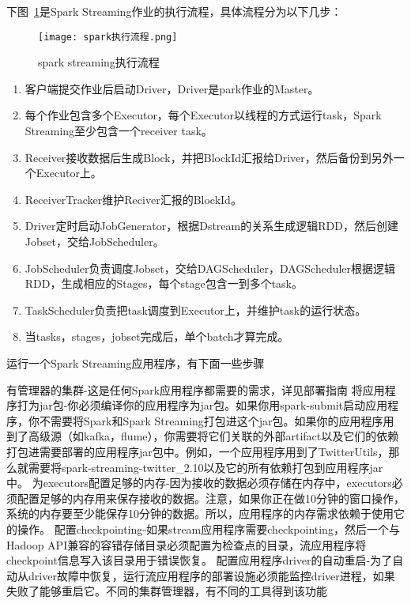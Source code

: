   下图~\ref{fig:spark streaming}是Spark Streaming作业的执行流程，具体流程分为以下几步：
  \begin{figure}
    \centering
    \texttt{[image: spark执行流程.png]}
    \caption{spark streaming执行流程}
    \label{fig:spark streaming}
  \end{figure}
 
  \begin{enumerate}[1.]
      \item  客户端提交作业后启动Driver，Driver是park作业的Master。
      \item 每个作业包含多个Executor，每个Executor以线程的方式运行task，Spark Streaming至少包含一个receiver task。
      \item Receiver接收数据后生成Block，并把BlockId汇报给Driver，然后备份到另外一个Executor上。
      \item ReceiverTracker维护Reciver汇报的BlockId。
      \item Driver定时启动JobGenerator，根据Dstream的关系生成逻辑RDD，然后创建Jobset，交给JobScheduler。
      \item JobScheduler负责调度Jobset，交给DAGScheduler，DAGScheduler根据逻辑RDD，生成相应的Stages，每个stage包含一到多个task。
      \item TaskScheduler负责把task调度到Executor上，并维护task的运行状态。
      \item 当tasks，stages，jobset完成后，单个batch才算完成。
  \end{enumerate}

  运行一个Spark Streaming应用程序，有下面一些步骤

  有管理器的集群-这是任何Spark应用程序都需要的需求，详见部署指南
  将应用程序打为jar包-你必须编译你的应用程序为jar包。如果你用spark-submit启动应用程序，你不需要将Spark和Spark Streaming打包进这个jar包。如果你的应用程序用到了高级源（如kafka，flume），你需要将它们关联的外部artifact以及它们的依赖打包进需要部署的应用程序jar包中。例如，一个应用程序用到了TwitterUtils，那么就需要将spark-streaming-twitter\_2.10以及它的所有依赖打包到应用程序jar中。
  为executors配置足够的内存-因为接收的数据必须存储在内存中，executors必须配置足够的内存用来保存接收的数据。注意，如果你正在做10分钟的窗口操作，系统的内存要至少能保存10分钟的数据。所以，应用程序的内存需求依赖于使用它的操作。
  配置checkpointing-如果stream应用程序需要checkpointing，然后一个与Hadoop API兼容的容错存储目录必须配置为检查点的目录，流应用程序将checkpoint信息写入该目录用于错误恢复。
  配置应用程序driver的自动重启-为了自动从driver故障中恢复，运行流应用程序的部署设施必须能监控driver进程，如果失败了能够重启它。不同的集群管理器，有不同的工具得到该功能
  
